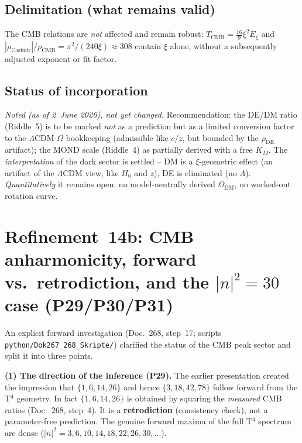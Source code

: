 \subsection*{Delimitation (what remains valid)}

The CMB relations are \emph{not} affected and remain robust:
$T_{\text{CMB}} = \tfrac{16}{9}\xi^2 E_\xi$ and
$|\rho_{\text{Casimir}}|/\rho_{\text{CMB}} = \pi^2/(240\xi) \approx 308$
contain $\xi$ alone, without a subsequently adjusted exponent or fit factor.

\subsection*{Status of incorporation}

\emph{Noted (as of 2~June 2026), not yet changed.} Recommendation: the DE/DM
ratio (Riddle~5) is to be marked \emph{not} as a prediction but as a limited
conversion factor to the $\Lambda$CDM-$\Omega$ bookkeeping (admissible like
$c/z$, but bounded by the $\rho_{\text{DE}}$ artifact); the MOND scale
(Riddle~4) as partially derived with a free $K_M$. The \emph{interpretation} of
the dark sector is settled -- DM is a $\xi$-geometric effect (an artifact of
the $\Lambda$CDM view, like $H_0$ and $z$), DE is eliminated (no $\Lambda$).
\emph{Quantitatively} it remains open: no model-neutrally derived
$\Omega_{\text{DM}}$, no worked-out rotation curve.

\section{\texorpdfstring{Refinement~14b: CMB anharmonicity, forward vs.\ retrodiction, and the $|n|^2=30$ case (P29/P30/P31)}{Refinement 14b: CMB anharmonicity, forward vs retrodiction}}

An explicit forward investigation (Doc.~268, step~17; scripts
\texttt{python/Dok267\_268\_Skripte/}) clarified the status of the CMB peak sector and
split it into three points.

\textbf{(1) The direction of the inference (P29).}
The earlier presentation created the impression that $\{1,6,14,26\}$ and hence
$\{3,18,42,78\}$ follow forward from the T$^4$ geometry. In fact
$\{1,6,14,26\}$ is obtained by squaring the \emph{measured} CMB ratios
(Doc.~268, step~4). It is a \textbf{retrodiction} (consistency check), not a
parameter-free prediction. The genuine forward maxima of the full T$^4$
spectrum are dense ($|n|^2=3,6,10,14,18,22,26,30,\ldots$).

